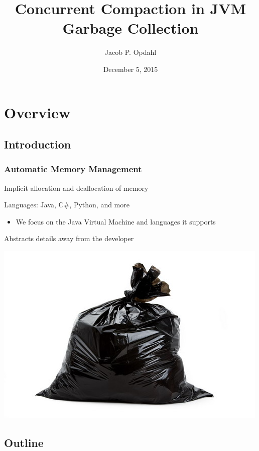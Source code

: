 \documentclass{beamer}
\title[Concurrent Compaction in JVM GC]{Concurrent Compaction in JVM Garbage Collection}
\author[Jacob Opdahl]{Jacob P. Opdahl}
\institute[UMM]
{
  University of Minnesota, Morris \\[\baselineskip]
  \emph{opdah023@morris.umn.edu}
}
\date[December 5, 2015] %
{December 5, 2015}
\newcommand{\linespace}{\vskip 0.25cm}
\begin{document}
\begin{frame}
  \titlepage
\end{frame}




\section*{Overview}

\subsection*{Introduction}

\begin{frame}

\frametitle{Automatic Memory Management}

Implicit allocation and deallocation of memory

\linespace
\linespace

Languages: Java, C\#, Python, and more
\begin{itemize}
\item We focus on the Java Virtual Machine and languages it supports
\end{itemize}

\linespace
\linespace

Abstracts details away from the developer

\linespace
\linespace

\begin{center}
\includegraphics[width=.3\textwidth]{Illustrations/garbage.jpg}
\end{center}

\end{frame}



\subsection*{Outline}
\end{document}

